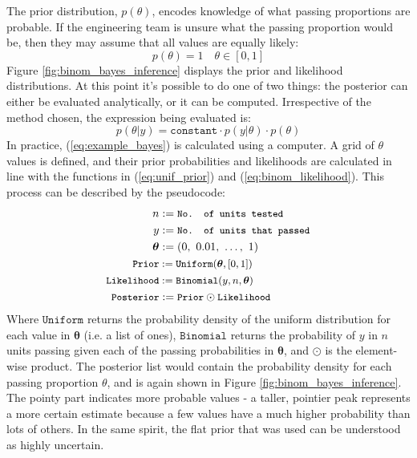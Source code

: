 \documentclass[11pt,a4paper,article]{memoir} %
\begin{document}
The prior distribution, $p(\theta)$, encodes knowledge of what passing proportions are probable. If the engineering team is unsure what the passing proportion would be, then they may assume that all values are equally likely:
\begin{equation}
  p(\theta) = 1 \quad \theta \in [0, 1]
  \label{eq:unif_prior}
\end{equation}
Figure \ref{fig:binom_bayes_inference} displays the prior and likelihood distributions. At this point it's possible to do one of two things: the posterior can either be evaluated analytically, or it can be computed. Irrespective of the method chosen, the expression being evaluated is:
\begin{equation}
	p(\theta|y) = \texttt{constant}\cdot p(y|\theta) \cdot p(\theta)
	\label{eq:example_bayes}
\end{equation}
In practice, (\ref{eq:example_bayes}) is calculated using a computer. A grid of $\theta$ values is defined, and their prior probabilities and likelihoods are calculated in line with the functions in (\ref{eq:unif_prior}) and (\ref{eq:binom_likelihood}). This process can be described by the pseudocode:
\begin{align}
  \quad n &:= \small{\texttt{No. of units tested}} \\
   \quad y &:= \small{\texttt{No. of units that passed}} \\
  \boldsymbol{\theta} & := (0, \ 0.01, \ \dots, \ 1) \\
  \small{\texttt{Prior}} &:= \small{\texttt{Uniform}}(\boldsymbol{\theta}, [0, 1]) \\
  \small{\texttt{Likelihood}} &:= \small{\texttt{Binomial}}(y, n, \boldsymbol{\theta}) \\ 
  \small{\texttt{Posterior}} &:= \small{\texttt{Prior} \odot \texttt{Likelihood}}
\end{align}
Where $\texttt{Uniform}$ returns the probability density of the uniform distribution for each value in $\boldsymbol{\theta}$ (i.e. a list of ones), $\texttt{Binomial}$ returns the probability of $y$ in $n$ units passing given each of the passing probabilities in $\boldsymbol{\theta}$, and $\odot$ is the element-wise product.
The posterior list would contain the probability density for each passing proportion $\theta$, and is again shown in Figure \ref{fig:binom_bayes_inference}. The pointy part indicates more probable values - a taller, pointier peak represents a more certain estimate because a few values have a much higher probability than lots of others. In the same spirit, the flat prior that was used can be understood as highly uncertain.
\end{document}
